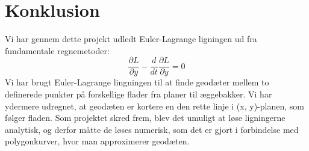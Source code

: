 \section{Konklusion}
Vi har gennem dette projekt udledt Euler-Lagrange ligningen ud fra fundamentale regnemetoder: 
$$\frac{\partial L}{\partial y}-\frac{d}{dt}\frac{\partial L}{\partial \dot{y}}=0$$
Vi har brugt Euler-Lagrange lingningen til at finde geodæter mellem to definerede punkter på forskellige flader fra planer til æggebakker. Vi har ydermere udregnet, at geodæten er kortere en den rette linje i (x, y)-planen, som følger fladen. Som projektet skred frem, blev det umuligt at løse ligningerne analytisk, og derfor måtte de løses numerisk, som det er gjort i forbindelse med polygonkurver, hvor man approximerer geodæten.